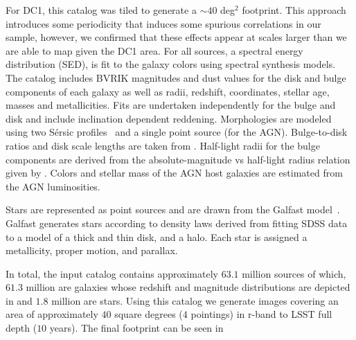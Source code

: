 \documentclass[\docopts]{\docclass}
\begin{document}
For DC1, this catalog was tiled to generate a $\sim 40$ deg$^{2}$ footprint. This approach introduces some periodicity that induces some spurious correlations in our sample, however, we confirmed that these effects appear at scales larger than we are able to map given the DC1 area. For all sources, a spectral energy distribution (SED), is fit to the galaxy colors using \citet{2003MNRAS.344.1000B} spectral synthesis models. The \citet{2006MNRAS.366..499D} catalog includes BVRIK magnitudes and dust values for the disk and bulge components of each galaxy as well as radii, redshift, coordinates, stellar age, masses and metallicities. Fits are undertaken independently for the bulge and disk and include inclination dependent reddening. Morphologies are modeled using two S\'{e}rsic profiles~\citep{1963BAAA....6...41S} and a single point source (for the AGN). Bulge-to-disk ratios and disk scale lengths are taken from \citep{2006MNRAS.366..499D}. Half-light radii for the bulge components are derived from the absolute-magnitude vs half-light radius relation given by \citet{2011A&A...534A...3G}. Colors and stellar mass of the AGN host galaxies are estimated from the AGN luminosities. 

Stars are represented as point sources and are drawn from the Galfast model~\citep{2008ApJ...673..864J}. Galfast generates stars according to density laws derived from fitting SDSS data to a model of a thick and thin disk, and a halo. Each star is assigned a metallicity, proper motion, and parallax. 

In total, the input catalog contains approximately $63.1$ million sources of which, $61.3$ million are galaxies whose redshift and magnitude distributions are depicted in  and $1.8$ million are stars. Using this catalog we generate images covering an area of approximately $40$ square degrees ($4$ pointings) in r-band to LSST full depth ($10$ years). The final footprint can be seen in 
\end{document}
